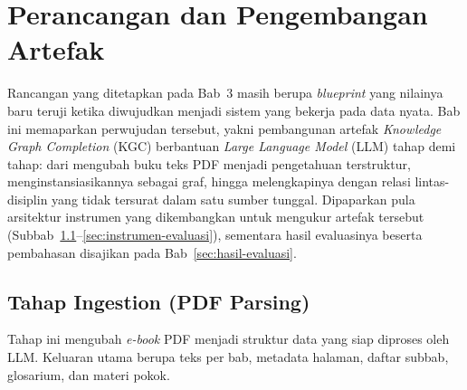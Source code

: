 \documentclass[../../thesis]{subfiles}
\begin{document}
\ifSubfilesClassLoaded{}{\setcounter{chapter}{3}}

\chapter{Perancangan dan Pengembangan Artefak}

Rancangan yang ditetapkan pada Bab~3 masih berupa \textit{blueprint} yang
nilainya baru teruji ketika diwujudkan menjadi sistem yang bekerja pada data
nyata. Bab ini
memaparkan perwujudan tersebut, yakni pembangunan artefak \textit{Knowledge
Graph Completion} (KGC) berbantuan \textit{Large Language Model} (LLM) tahap
demi tahap: dari mengubah buku teks PDF menjadi pengetahuan terstruktur,
menginstansiasikannya sebagai graf, hingga melengkapinya dengan relasi
lintas-disiplin yang tidak tersurat dalam satu sumber tunggal. Dipaparkan pula
arsitektur instrumen yang dikembangkan untuk mengukur artefak tersebut
(Subbab~\ref{sec:ingestion}--\ref{sec:instrumen-evaluasi}), sementara hasil
evaluasinya beserta pembahasan disajikan pada Bab~\ref{sec:hasil-evaluasi}.

\section{Tahap Ingestion (PDF Parsing)}\label{sec:ingestion}

Tahap ini mengubah \textit{e-book} PDF menjadi struktur data yang siap
diproses oleh LLM. Keluaran utama berupa teks per bab, metadata halaman,
daftar subbab, glosarium, dan materi pokok.
\end{document}
